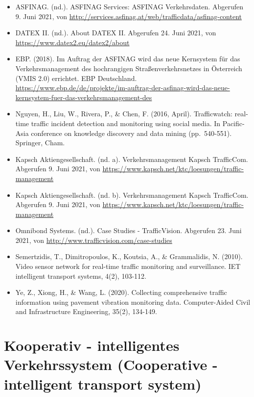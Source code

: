 \documentclass[
]{book}
\providecommand{\tightlist}{%
  \setlength{\itemsep}{0pt}\setlength{\parskip}{0pt}}
\begin{document}
\begin{itemize}
\tightlist
\item
  ASFINAG. (nd.). ASFINAG Services: ASFINAG Verkehrsdaten. Abgerufen 9. Juni 2021, von \url{http://services.asfinag.at/web/trafficdata/asfinag-content}
\item
  DATEX II. (nd.). About \textbar{} DATEX II. Abgerufen 24. Juni 2021, von \url{https://www.datex2.eu/datex2/about}
\item
  EBP. (2018). Im Auftrag der ASFINAG wird das neue Kernsystem für das Verkehrsmanagement des hochrangigen Straßenverkehrsnetzes in Österreich (VMIS 2.0) errichtet. \textbar{} EBP \textbar{} Deutschland. \url{https://www.ebp.de/de/projekte/im-auftrag-der-asfinag-wird-das-neue-kernsystem-fuer-das-verkehrsmanagement-des}
\item
  Nguyen, H., Liu, W., Rivera, P., \& Chen, F. (2016, April). Trafficwatch: real-time traffic incident detection and monitoring using social media. In Pacific-Asia conference on knowledge discovery and data mining (pp.~540-551). Springer, Cham.
\item
  Kapsch Aktiengesellschaft. (nd. a). Verkehrsmanagement \textbar{} Kapsch TrafficCom. Abgerufen 9. Juni 2021, von \url{https://www.kapsch.net/ktc/loesungen/traffic-management}
\item
  Kapsch Aktiengesellschaft. (nd. b). Verkehrsmanagement \textbar{} Kapsch TrafficCom. Abgerufen 9. Juni 2021, von \url{https://www.kapsch.net/ktc/loesungen/traffic-management}
\item
  Omnibond Systems. (nd.). Case Studies - TrafficVision. Abgerufen 23. Juni 2021, von \url{http://www.trafficvision.com/case-studies}
\item
  Semertzidis, T., Dimitropoulos, K., Koutsia, A., \& Grammalidis, N. (2010). Video sensor network for real-time traffic monitoring and surveillance. IET intelligent transport systems, 4(2), 103-112.
\item
  Ye, Z., Xiong, H., \& Wang, L. (2020). Collecting comprehensive traffic information using pavement vibration monitoring data. Computer-Aided Civil and Infrastructure Engineering, 35(2), 134-149.
\end{itemize}

\hypertarget{cits}{%
\section{Kooperativ - intelligentes Verkehrssystem (Cooperative - intelligent transport system)}\label{cits}}
\end{document}
